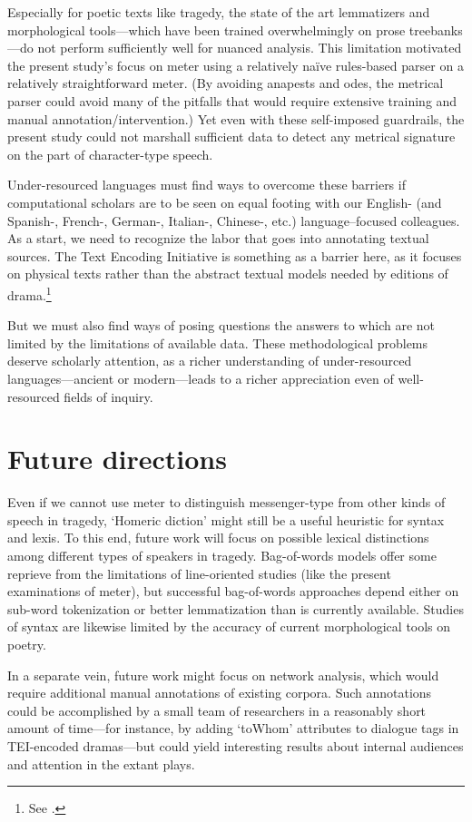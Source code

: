 \documentclass[
]{ceurart}
\begin{document}
Especially for poetic texts like tragedy, the state of the art lemmatizers
and morphological tools---which have been trained overwhelmingly on prose
treebanks---do not perform sufficiently well for nuanced analysis. This
limitation motivated the present study's focus on meter using a relatively
naïve rules-based parser on a relatively straightforward meter. (By avoiding
anapests and odes, the metrical parser could avoid many of the pitfalls
that would require extensive training and manual annotation/intervention.)
Yet even with these self-imposed guardrails, the present study could not
marshall sufficient data to detect any metrical signature on the part of
character-type speech.

Under-resourced languages must find ways to overcome these barriers if
computational scholars are to be seen on equal footing with our English-
(and Spanish-, French-, German-, Italian-, Chinese-, etc.) language–focused
colleagues. As a start, we need to recognize the labor that goes into annotating
textual sources. The Text Encoding Initiative is something as a barrier here,
as it focuses on physical texts rather than the abstract textual models needed
by editions of drama.\footnote{See \cite{Efer2017}.}

But we must also find ways of posing questions the answers to which are not limited
by the limitations of available data. These methodological problems deserve
scholarly attention, as a richer understanding of under-resourced languages---ancient
or modern---leads to a richer appreciation even of well-resourced fields of inquiry.


\section{Future directions}

Even if we cannot use meter to distinguish messenger-type from other kinds of
speech in tragedy, `Homeric diction' might still be a useful heuristic for
syntax and lexis. To this end, future work will focus on possible lexical
distinctions among different types of speakers in tragedy. Bag-of-words
models offer some reprieve from the limitations of line-oriented studies
(like the present examinations of meter), but successful bag-of-words approaches
depend either on sub-word tokenization or better lemmatization than is currently
available. Studies of syntax are likewise limited by the accuracy of current
morphological tools on poetry.

In a separate vein, future work might focus on network analysis, which would
require additional manual annotations of existing corpora. Such annotations
could be accomplished by a small team of researchers in a reasonably short
amount of time---for instance, by adding `toWhom' attributes to dialogue
tags in TEI-encoded dramas---but could yield interesting results about
internal audiences and attention in the extant plays.
\end{document}
